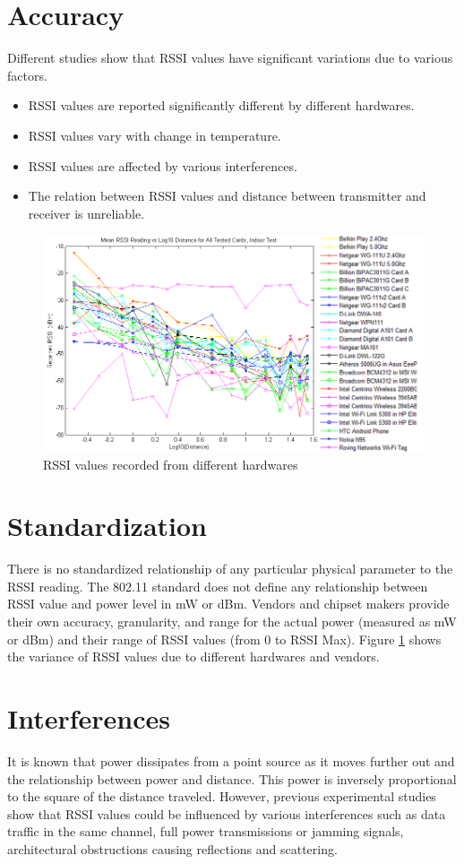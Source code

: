\documentclass[11pt,a4paper,headinclude,footinclude,chapterprefix=on]{scrreprt}
\begin{document}
\section{Accuracy} Different studies show that RSSI values have significant variations due to various factors. 
\begin{itemize}
	\item RSSI values are reported significantly different by different hardwares. 
	\item RSSI values vary with change in temperature. 
	\item RSSI values are affected by various interferences. 
	\item The relation between RSSI values and distance between transmitter and receiver is unreliable. 
\end{itemize}
\begin{figure}
	[!h] \centering 
	\includegraphics[width=13cm]{Images/rssi_vendor1.png} \caption{RSSI values recorded from different hardwares} \label{fig:rssi_vendors} 
\end{figure}

\section{Standardization} There is no standardized relationship of any particular physical parameter to the RSSI reading. The 802.11 standard does not define any relationship between RSSI value and power level in mW or dBm. Vendors and chipset makers provide their own accuracy, granularity, and range for the actual power (measured as mW or dBm) and their range of RSSI values (from 0 to RSSI Max). Figure \ref{fig:rssi_vendors} shows the variance of RSSI values due to different hardwares and vendors.

\section{Interferences} It is known that power dissipates from a point source as it moves further out and the relationship between power and distance. This power is inversely proportional to the square of the distance traveled. However, previous experimental studies show that RSSI values could be influenced by various interferences such as data traffic in the same channel, full power transmissions or jamming signals, architectural obstructions causing reflections and scattering.
\end{document}
